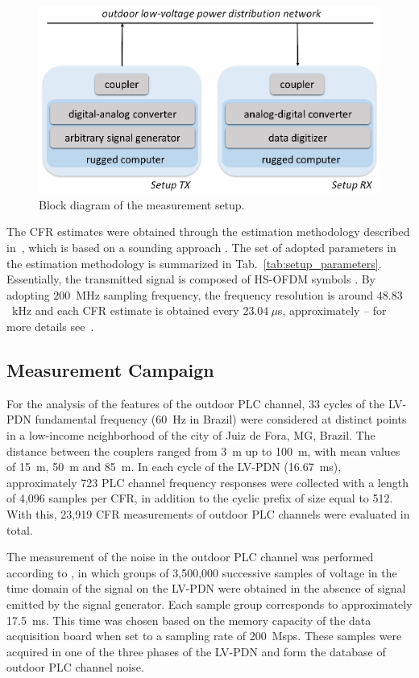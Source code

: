 \documentclass[journal]{IEEEtran}
\begin{document}
\begin{figure}[htb]
\begin{centering}
    \includegraphics[scale=.6]{Figuras/setups.eps}
    \caption{Block diagram of the measurement setup.}
    \label{fig:setup}
\end{centering}
\end{figure}

The \ac{CFR} estimates were obtained through the estimation methodology described in~\cite{Oliveira2014}, which is based on a sounding approach \cite{Parsons1991}. The set of adopted parameters in the estimation methodology is summarized in Tab.~\ref{tab:setup_parameters}.
Essentially, the transmitted signal is composed of \ac{HS-OFDM} symbols \cite{Ribeiro2014a}. By adopting  $200$~MHz sampling frequency, the frequency resolution is around $48.83$~kHz and each \ac{CFR} estimate is obtained every $23.04~\mu$s, approximately -- for more details see~\cite{Oliveira2013a}. 

\subsection{Measurement Campaign}
For the analysis of the features of the outdoor PLC channel, 33 cycles of the \ac{LV-PDN} fundamental frequency (60~Hz in Brazil) were considered at distinct points in a low-income neighborhood of the city of Juiz de Fora, MG, Brazil. The distance between the couplers ranged from 3~m up to 100~m, with mean values of 15~m, 50~m and 85~m. In each cycle of the \ac{LV-PDN} (16.67~ms), approximately 723 PLC channel frequency responses were collected with a length of 4,096 samples per CFR, in addition to the cyclic prefix of size equal to 512. With this, 23,919 CFR measurements of outdoor PLC channels were evaluated in total.

The measurement of the noise in the outdoor PLC channel was performed according to \cite{Andrade2013}, in which groups of 3,500,000 successive samples of voltage in the time domain of the signal on the \ac{LV-PDN} were obtained in the absence of signal emitted by the signal generator. Each sample group corresponds to approximately 17.5~ms. This time was chosen based on the memory capacity of the data acquisition board when set to a sampling rate of 200~Msps. These samples were acquired in one of the three phases of the \ac{LV-PDN} and form the database of outdoor PLC channel noise.
\end{document}
